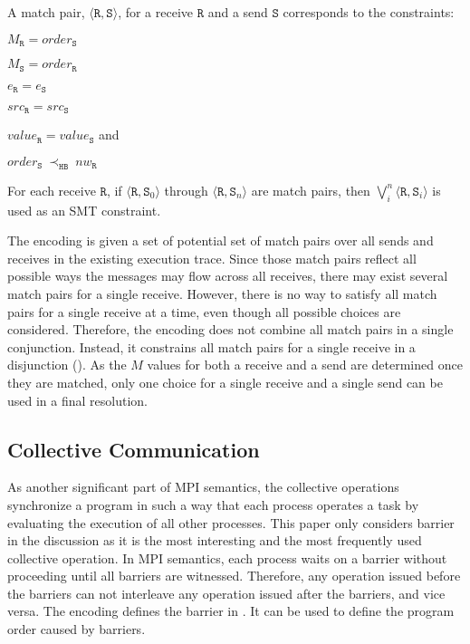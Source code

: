 \begin{definition} \label{def:match}
A match pair, $\langle\mathtt{R}, \mathtt{S}\rangle$, for a receive
$\mathtt{R}$ and a send $\mathtt{S}$ corresponds to the constraints:
\begin{compactenum}
\item $M_{\mathtt{R}} = \mathit{order}_{\mathtt{S}}$
\item $M_{\mathtt{S}} = \mathit{order}_{\mathtt{R}}$
\item $e_{\mathtt{R}} = e_{\mathtt{S}}$
\item $src_\mathtt{R} = src_\mathtt{S}$
\item $\mathit{value}_{\mathtt{R}} = \mathit{value}_{\mathtt{S}}$ and
\item $\mathit{order}_{\mathtt{S}}\ \mathrm{\prec_\mathtt{HB}}\ \mathit{nw}_{\mathtt{R}}$
\end{compactenum}
\end{definition}

\begin{definition} \label{def:receive_match}
For each receive $\mathtt{R}$, if $\langle\mathtt{R},
\mathtt{S}_0\rangle$ through $\langle\mathtt{R}, \mathtt{S}_n\rangle$
are match pairs, then $\bigvee_{i}^{n} \langle\mathtt{R},
\mathtt{S}_i\rangle$ is used as an SMT constraint.
\end{definition}

The encoding is given a set of potential set of match pairs over all sends and receives in the existing execution trace. Since those match pairs reflect all possible ways the messages may flow across all receives, there may exist several match pairs for a single receive. However, there is no way to satisfy all match pairs for a single receive at a time, even though all possible choices are considered. Therefore, the encoding does not combine all match pairs in a single conjunction. Instead, it constrains all match pairs for a single receive in a disjunction (). As the $M$ values for both a receive and a send are determined once they are matched, only one choice for a single receive and a single send can be used in a final resolution.

\subsection{Collective Communication}
As another significant part of MPI semantics, the collective operations synchronize a program in such a way that each process operates a task by evaluating the execution of all other processes. This paper only considers barrier in the discussion as it is the most interesting and the most frequently used collective operation. In MPI semantics, each process waits on a barrier without proceeding until all barriers are witnessed. Therefore, any operation issued before the barriers can not interleave any operation issued after the barriers, and vice versa. The encoding defines the barrier in . It can be used to define the program order caused by barriers.

